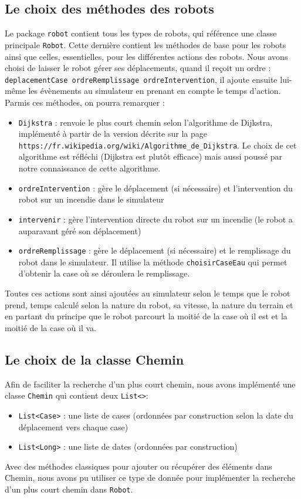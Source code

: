 \documentclass[12pt]{article}
\begin{document}
\subsection{Le choix des méthodes des robots}
Le package {\tt robot} contient tous les types de robots, qui référence une classe principale {\tt Robot}. Cette dernière contient les méthodes de base pour les robots ainsi que celles, essentielles, pour les différentes actions des robots. Nous avons choisi de laisser le robot gérer ses déplacements, quand il reçoit un ordre : {\tt deplacementCase ordreRemplissage ordreIntervention}, il ajoute ensuite lui-même les évènements au simulateur en prenant en compte le temps d'action.\\
Parmis ces méthodes, on pourra remarquer :
\begin{itemize}
  \item {\tt Dijkstra} : renvoie le plus court chemin selon l'algorithme de Dijkstra, implémenté à partir de la version décrite sur la page \\ {\tt  https://fr.wikipedia.org/wiki/Algorithme\_de\_Dijkstra}. Le choix de cet algorithme est réfléchi (Dijkstra est plutôt efficace) mais aussi poussé par notre connaissance de cette algorithme.
  \item {\tt ordreIntervention} : gère le déplacement (si nécessaire) et l'intervention du robot sur un incendie dans le simulateur
  \item {\tt intervenir} : gère l'intervention directe du robot sur un incendie (le robot a auparavant géré son déplacement)
  \item {\tt ordreRemplissage} : gère le déplacement (si nécessaire) et le remplissage du robot dans le simulateur. Il utilise la méthode {\tt choisirCaseEau} qui permet d'obtenir la case où se déroulera le remplissage.
\end{itemize}
Toutes ces actions sont ainsi ajoutées au simulateur selon le temps que le robot prend, temps calculé selon la nature du robot, sa vitesse, la nature du terrain et en partant du principe que le robot parcourt la moitié de la case où il est et la moitié de la case où il va.

\subsection{Le choix de la classe Chemin}
Afin de faciliter la recherche d'un plus court chemin, nous avons implémenté une classe {\tt Chemin} qui contient deux {\tt List<>}:
\begin{itemize}
  \item {\tt List<Case>} : une liste de cases (ordonnées par construction selon la date du déplacement vers chaque case)
  \item {\tt List<Long>} : une liste de dates (ordonnées par construction)
\end{itemize}
Avec des méthodes classiques pour ajouter ou récupérer des éléments dans Chemin, nous avons pu utiliser ce type de donnée pour implémenter la recherche d'un plus court chemin dans {\tt Robot}.
\end{document}
